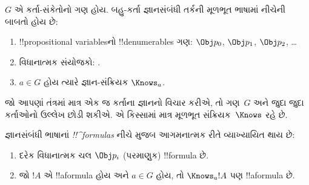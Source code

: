 \documentclass[../../../include/open-logic-section]{subfiles}
\begin{document}


\begin{defn}
$G$ એ કર્તા-સંકેતોનો ગણ હોય. બહુ-કર્તા જ્ઞાનસંબંધી તર્કની
મૂળભૂત ભાષામાં નીચેની બાબતો હોય છે:
\begin{enumerate}
  \item !!{propositional variable}sનો !!{denumerable}s ગણ: $\Obj
    p_0$, $\Obj p_1$, $\Obj p_2$, \dots
  \item વિધાનાત્મક સંયોજકો: \startycommalist
  .
  \item $a \in G$ હોય ત્યારે જ્ઞાન-સંક્રિયક $\Knows_a$.
\end{enumerate}
\end{defn}

જો આપણાં તંત્રમાં માત્ર એક જ કર્તાના જ્ઞાનનો વિચાર કરીએ, તો
ગણ~$G$ અને જુદા જુદા કર્તાઓનો ઉલ્લેખ છોડી શકીએ. એ કિસ્સામાં
માત્ર મૂળભૂત સંક્રિયક~$\Knows$ રહે છે.

\begin{defn}
જ્ઞાનસંબંધી ભાષાનાં \emph{!!^{formula}s} નીચે મુજબ આગમનાત્મક રીતે
  વ્યાખ્યાયિત થાય છે:
\begin{enumerate}


\item દરેક વિધાનાત્મક ચલ $\Obj p_i$ (પરમાણુક) !!{formula} છે.






\item જો $!A$ એ !!a{formula} હોય અને $a \in G$ હોય, તો $\Knows_a !A$
  પણ !!a{formula} છે.

\end{enumerate}
\end{defn}
\end{document}
